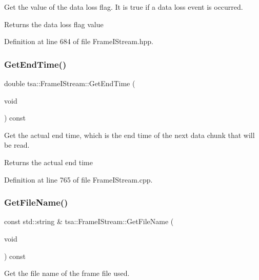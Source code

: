 Get the value of the data loss flag. It is true if a data loss event is occurred.

\begin{DoxyReturn}{Returns}
the data loss flag value 
\end{DoxyReturn}


Definition at line 684 of file Frame\+I\+Stream.\+hpp.

\mbox{\label{classtsa_1_1_frame_i_stream_a2b54726738d6155f6e4ccbae2b4a3f8f}} 
\subsubsection{\texorpdfstring{Get\+End\+Time()}{GetEndTime()}}
{\footnotesize\ttfamily double tsa\+::\+Frame\+I\+Stream\+::\+Get\+End\+Time (\begin{DoxyParamCaption}\item[{void}]{ }\end{DoxyParamCaption}) const}

Get the actual end time, which is the end time of the next data chunk that will be read.

\begin{DoxyReturn}{Returns}
the actual end time 
\end{DoxyReturn}


Definition at line 765 of file Frame\+I\+Stream.\+cpp.

\mbox{\label{classtsa_1_1_frame_i_stream_aa5e27458593c788665c737f40c445bf4}} 
\subsubsection{\texorpdfstring{Get\+File\+Name()}{GetFileName()}}
{\footnotesize\ttfamily const std\+::string \& tsa\+::\+Frame\+I\+Stream\+::\+Get\+File\+Name (\begin{DoxyParamCaption}\item[{void}]{ }\end{DoxyParamCaption}) const}

Get the file name of the frame file used.

